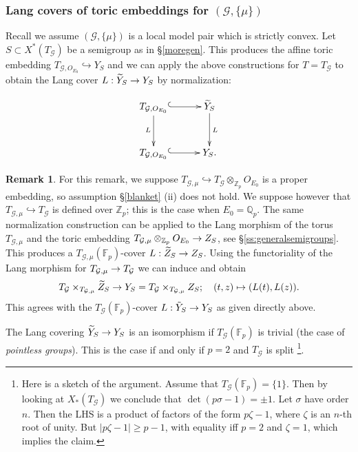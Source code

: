 \documentclass[reqno, 10pt]{amsart}
\makeatletter
\newcommand{\BF}{\ensuremath{\mathbb {F}}\xspace}
\newcommand{\BQ}{\ensuremath{\mathbb {Q}}\xspace}
\newcommand{\BZ}{\ensuremath{\mathbb {Z}}\xspace}
\newcommand{\CG}{\ensuremath{\mathcal {G}}\xspace}
\newcommand{\wt}{\widetilde}
\theoremstyle{definition}
\newtheorem{remark}[subsubsection]{Remark}
\numberwithin{equation}{subsection}
\numberwithin{subsubsection}{subsection}
\renewcommand{\to}{%
   \ifbool{@display}{\longrightarrow}{\rightarrow}%
   }
\let\shortmapsto\mapsto
\renewcommand{\mapsto}{%
   \ifbool{@display}{\shortmapsto}{\shortmapsto}%
   }
\newcommand{\ti}{\tilde}
\makeatother
\begin{document}
 \subsubsection{Lang covers of toric embeddings for $(\CG,\{\mu\})$}
Recall we assume $(\CG, \{\mu\})$ is a local model pair which is strictly convex. 
Let  $S\subset X^*(T_{\CG})$ be a semigroup as in \S \ref{moregen}. This produces the affine toric embedding $T_{\CG, O_{E_0}}\hookrightarrow  Y_{S}$ and we can apply the above constructions for $T=T_\CG$ to obtain the Lang cover $L: \wt Y_S\to Y_S$ by normalization: 

 \begin{equation}\label{LangNormalization2}
\begin{aligned}
 \xymatrix@R=3em@C=3em{
        T_{\CG, O_{E_0}} \ar@{^{(}->}[r] \ar[d]_{L}  &  \wt Y_{S}  \ar[d]^L \\
        T_{\CG, O_{E_0}} \ar@{^{(}->}[r]  & Y_{S}.
        }
        \end{aligned}
\end{equation}

 \begin{remark}\label{rem:YvsZ}
For this remark, we suppose $T_{\CG,\mu}\hookrightarrow T_\CG\otimes_{\BZ_p}O_{E_0}$ is a proper embedding, so assumption \S \ref{blanket} (ii) does not hold. We suppose however  that $T_{\CG,\mu}\hookrightarrow T_\CG$ is  defined over $\BZ_p$; this is the case when $E_0=\BQ_p$. The same normalization construction can be applied to the Lang morphism of the torus $T_{\CG,\mu}$ and the toric embedding $T_{\CG,\mu}\otimes_{\BZ_p}O_{E_0}\to Z_S$, see \S \ref{ss:generalsemigroups}. This produces a $T_{\CG,\mu}(\BF_p)$-cover $L: \wt Z_S\to Z_S$. Using the functoriality of the Lang morphism for $T_{\CG,\mu}\to T_\CG$ we can induce and obtain
 \[
 T_\CG\times_{T_{\CG,\mu}}\wt Z_S\to  Y_S=T_\CG\times_{T_{\CG,\mu}}Z_S; \quad (t, z)\mapsto (L(t), L(z)).
 \]
This agrees with the $T_\CG(\BF_p)$-cover $L: \ti Y_S\to Y_S$ as given directly above.
 \end{remark}
 The Lang covering $\wt Y_S\to Y_S$ is an isomorphism if $T_{\CG}(\BF_p)$ is trivial (the case of \emph{pointless groups}).  This is the case if and only if $p=2$ and $T_{\CG}$ is split \cite{MO}\footnote{ Here is a sketch of the argument. Assume that $T_\CG(\BF_p)=\{1\}$. Then by looking at $X_*(T_\CG)$ we conclude that $\det(p\sigma-1)=\pm 1$.  Let $\sigma$ have order $n$. Then the LHS is a product of factors of the form $p\zeta-1$, where $\zeta$ is an $n$-th root of unity. But $|p\zeta-1|\geq p-1$, with equality iff $p=2$ and $\zeta=1$, which implies the claim. }.  
\end{document}
